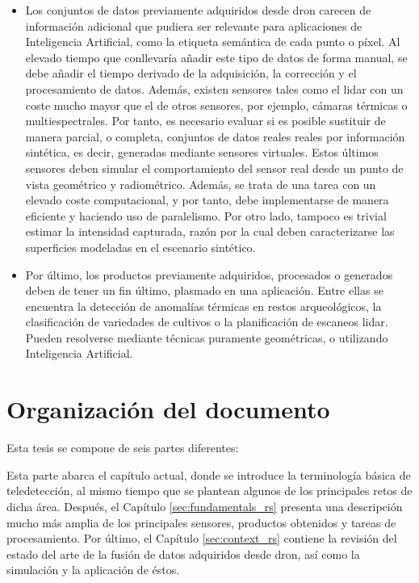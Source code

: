 \begin{itemize}
    \item Los conjuntos de datos previamente adquiridos desde dron carecen de información adicional que pudiera ser relevante para aplicaciones de Inteligencia Artificial, como la etiqueta semántica de cada punto o píxel. Al elevado tiempo que conllevaría añadir este tipo de datos de forma manual, se debe añadir el tiempo derivado de la adquisición, la corrección y el procesamiento de datos. Además, existen sensores tales como el \acrshort{lidar} con un coste mucho mayor que el de otros sensores, por ejemplo, cámaras térmicas o multiespectrales. Por tanto, es necesario evaluar si es posible sustituir de manera parcial, o completa, conjuntos de datos reales reales por información sintética, es decir, generadas mediante sensores virtuales. Estos últimos sensores deben simular el comportamiento del sensor real desde un punto de vista geométrico y radiométrico. Además, se trata de una tarea con un elevado coste computacional, y por tanto, debe implementarse de manera eficiente y haciendo uso de paralelismo. Por otro lado, tampoco es trivial estimar la intensidad capturada, razón por la cual deben caracterizarse las superficies modeladas en el escenario sintético.
    \item Por último, los productos previamente adquiridos, procesados o generados deben de tener un fin último, plasmado en una aplicación. Entre ellas se encuentra la detección de anomalías térmicas en restos arqueológicos, la clasificación de variedades de cultivos o la planificación de escaneos \acrshort{lidar}. Pueden resolverse mediante técnicas puramente geométricas, o utilizando Inteligencia Artificial.
\end{itemize}

\section{Organización del documento}

\newcommand{\partSpacing}{1mm}

Esta tesis se compone de seis partes diferentes:

\small \textbf{} \normalsize\hspace{\partSpacing} Esta parte abarca el capítulo actual, donde se introduce la terminología básica de teledetección, al mismo tiempo que se plantean algunos de los principales retos de dicha área. Después, el Capítulo \ref{sec:fundamentals_rs} presenta una descripción mucho más amplia de los principales sensores, productos obtenidos y tareas de procesamiento. Por último, el Capítulo \ref{sec:context_rs} contiene la revisión del estado del arte de la fusión de datos adquiridos desde dron, así como la simulación y la aplicación de éstos.

